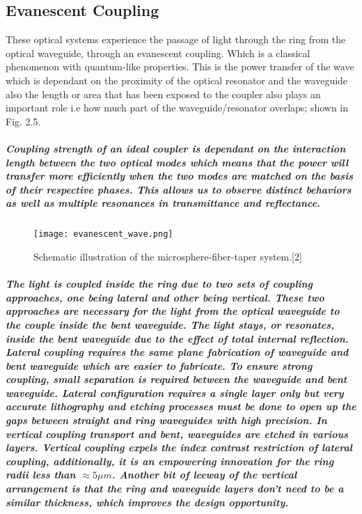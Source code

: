 \subsection{Evanescent Coupling}
These optical systems experience the passage of light through the ring from the optical waveguide, through an evanescent coupling. Which is a classical phenomenon with quantum-like properties. This is the power transfer of the wave which is dependant on the proximity of the optical resonator and the waveguide also the length or area that has been exposed to the coupler also plays an important role i.e how much part of the waveguide/resonator overlaps; shown in Fig. 2.5.
\subparagraph{\normalfont \large Coupling strength of an ideal coupler is dependant on the interaction length between the two optical modes which means that the power will transfer more efficiently when the two modes are matched on the basis of their respective phases. This allows us to observe distinct behaviors as well as multiple resonances in transmittance and reflectance.} 

\begin{figure}[h]
\centering
\texttt{[image: evanescent\_wave.png]}
\caption{Schematic illustration of the microsphere-fiber-taper
system.[2]}
\end{figure}

\subparagraph{\normalfont \large The light is coupled inside the ring due to two sets of coupling approaches, one being lateral and other being vertical. These two approaches are necessary for the light from the optical waveguide to the couple inside the bent waveguide. The light stays, or resonates, inside the bent waveguide due to the effect of total internal reflection. Lateral coupling requires the same plane fabrication of waveguide and bent waveguide which are easier to fabricate. To ensure strong coupling, small separation is required between the waveguide and bent waveguide. Lateral configuration requires a single layer only but very accurate lithography and etching processes must be done to open up the gaps between straight and ring waveguides with high precision. In vertical coupling transport and bent, waveguides are etched in various layers. Vertical coupling expels the index contrast restriction of lateral coupling, additionally, it is an empowering innovation for the ring radii less than $ \approx5 \mu m$. Another bit of leeway of the vertical arrangement is that the ring and waveguide layers don't need to be a similar thickness, which improves the design opportunity.}


